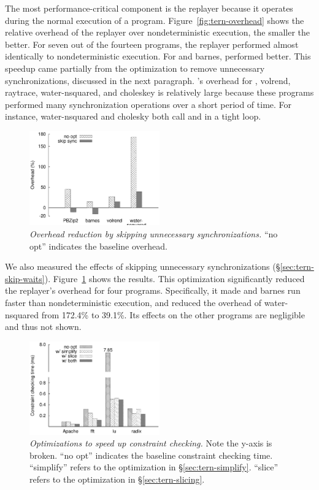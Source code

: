 The most performance-critical component is the replayer because it
operates during the normal execution of a program.
Figure~\ref{fig:tern-overhead} shows the relative overhead of the replayer over
nondeterministic execution, the smaller the better.  For seven out of
the fourteen programs, the replayer performed almost identically to
nondeterministic execution. For \pbzip and barnes, \tern performed
better.  This speedup came partially from the optimization to remove
unnecessary synchronizations, discussed in the next paragraph.  \tern's overhead
for \mysql, volrend, raytrace, water-nsquared, and choleskey is relatively
large because these programs performed many synchronization operations
over a short period of time.  For instance, water-nsquared and cholesky
both call  and  in a
tight loop.


\begin{figure}[t]
\centering
\includegraphics[width=0.5\textwidth]{tern/figures/opt-overhead}
\caption{\small {\em Overhead reduction by skipping unnecessary
    synchronizations.} ``no opt'' indicates the baseline overhead.}
\label{fig:tern-opt-remove-sync}
\end{figure}

We also measured the effects of skipping unnecessary synchronizations
(\S\ref{sec:tern-skip-waits}).  Figure~\ref{fig:tern-opt-remove-sync} shows the
results.  This optimization significantly reduced the replayer's overhead
for four programs.  Specifically, it made \pbzip and barnes run faster
than nondeterministic execution, and reduced the overhead of
water-nsquared from 172.4\% to 39.1\%.  Its effects on the other programs are
negligible and thus not shown.

\begin{figure}[t]
\centering
\includegraphics[width=0.5\textwidth]{tern/figures/expr-opt-time}
\caption{\small {\em Optimizations to speed up constraint checking.} Note
  the y-axis is broken. ``no opt'' indicates the baseline constraint checking
  time. ``simplify'' refers to the optimization in
  \S\ref{sec:tern-simplify}. ``slice'' refers to the optimization in
  \S\ref{sec:tern-slicing}.}
\label{fig:tern-opt-remove-constraints}
\end{figure}

